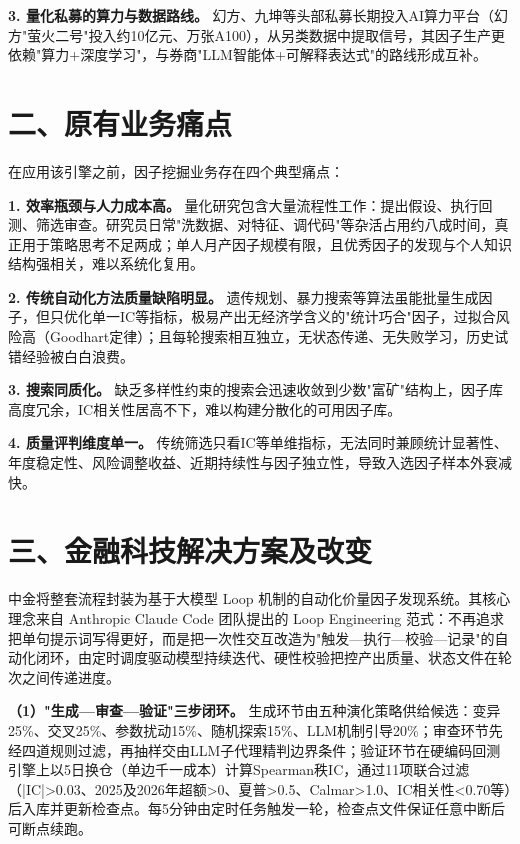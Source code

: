 \documentclass[UTF8,a4paper,zihao=-4,fontset=fandol]{ctexart}
\begin{document}
\textbf{3. 量化私募的算力与数据路线。} 幻方、九坤等头部私募长期投入AI算力平台（幻方"萤火二号"投入约10亿元、万张A100），从另类数据中提取信号，其因子生产更依赖"算力+深度学习"，与券商"LLM智能体+可解释表达式"的路线形成互补。

\section{二、原有业务痛点}
在应用该引擎之前，因子挖掘业务存在四个典型痛点：

\textbf{1. 效率瓶颈与人力成本高。} 量化研究包含大量流程性工作：提出假设、执行回测、筛选审查。研究员日常"洗数据、对特征、调代码"等杂活占用约八成时间，真正用于策略思考不足两成\cite{infoq-autoresearch}；单人月产因子规模有限，且优秀因子的发现与个人知识结构强相关，难以系统化复用\cite{cicc-loop-2026}。

\textbf{2. 传统自动化方法质量缺陷明显。} 遗传规划、暴力搜索等算法虽能批量生成因子，但只优化单一IC等指标，极易产出无经济学含义的"统计巧合"因子，过拟合风险高（Goodhart定律）；且每轮搜索相互独立，无状态传递、无失败学习，历史试错经验被白白浪费\cite{cicc-loop-2026}\cite{ky-factor-mining}。

\textbf{3. 搜索同质化。} 缺乏多样性约束的搜索会迅速收敛到少数"富矿"结构上，因子库高度冗余，IC相关性居高不下，难以构建分散化的可用因子库\cite{cicc-loop-2026}。

\textbf{4. 质量评判维度单一。} 传统筛选只看IC等单维指标，无法同时兼顾统计显著性、年度稳定性、风险调整收益、近期持续性与因子独立性，导致入选因子样本外衰减快\cite{cicc-loop-2026}。

\section{三、金融科技解决方案及改变}
中金将整套流程封装为基于大模型 Loop 机制的自动化价量因子发现系统。其核心理念来自 Anthropic Claude Code 团队提出的 Loop Engineering 范式：不再追求把单句提示词写得更好，而是把一次性交互改造为"触发—执行—校验—记录"的自动化闭环，由定时调度驱动模型持续迭代、硬性校验把控产出质量、状态文件在轮次之间传递进度\cite{cicc-loop-2026}。

\textbf{（1）"生成—审查—验证"三步闭环。} 生成环节由五种演化策略供给候选：变异25\%、交叉25\%、参数扰动15\%、随机探索15\%、LLM机制引导20\%；审查环节先经四道规则过滤，再抽样交由LLM子代理精判边界条件；验证环节在硬编码回测引擎上以5日换仓（单边千一成本）计算Spearman秩IC，通过11项联合过滤（|IC|>0.03、2025及2026年超额>0、夏普>0.5、Calmar>1.0、IC相关性<0.70等）后入库并更新检查点。每5分钟由定时任务触发一轮，检查点文件保证任意中断后可断点续跑\cite{cicc-loop-2026}。
\end{document}
